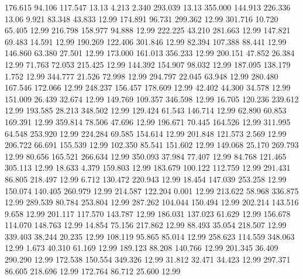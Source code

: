  176.615   94.106  117.547        13.13
   4.213    2.340  293.039        13.13
 355.000  144.913  226.336        13.06
   9.921   83.348   43.833        12.99
 174.891   96.731  299.362        12.99
 301.716   10.720   65.405        12.99
 216.798  158.977   94.888        12.99
 222.225   43.210  281.663        12.99
 147.821   69.483   14.591        12.99
 190.269  122.406  301.846        12.99
  82.394  107.388   88.441        12.99
 146.860   63.380   27.501        12.99
 173.000  161.013  356.233        12.99
 200.151   47.852   26.384        12.99
  71.763   72.053  215.425        12.99
 144.392  154.907   98.032        12.99
 187.095  138.179    1.752        12.99
 344.777   21.526   72.998        12.99
 294.797   22.045   63.948        12.99
 280.480  167.546  172.066        12.99
 248.237  156.457  178.609        12.99
  42.402   44.300   34.578        12.99
 151.009   26.439   32.674        12.99
 149.769  109.357  346.598        12.99
  16.705  120.236  239.612        12.99
 193.585   28.213  348.502        12.99
 129.424   61.543  146.714        12.99
  62.890   60.853  169.391        12.99
 359.814   78.506   47.696        12.99
 196.671   70.445  164.526        12.99
 311.995   64.548  253.920        12.99
 224.284   69.585  154.614        12.99
 201.848  121.573    2.569        12.99
 206.722   66.691  155.539        12.99
 102.350   85.541  151.602        12.99
 149.068   25.170  269.793        12.99
  80.656  165.521  266.634        12.99
 350.093   37.984   77.407        12.99
  84.768  121.465  305.113        12.99
  18.633    4.379  159.803        12.99
 183.679  100.122  112.759        12.99
 291.431   86.805  218.497        12.99
   6.712  130.472  220.943        12.99
  18.454  147.039  253.258        12.99
 150.074  140.405  260.979        12.99
 214.587  122.204    0.001        12.99
 213.622   58.968  336.875        12.99
 289.539   80.784  253.804        12.99
 287.262  104.044  150.494        12.99
 202.214  143.516    9.658        12.99
 201.117  117.570  143.787        12.99
 186.031  137.023   61.629        12.99
 156.678  114.070  148.763        12.99
  14.854   75.156  217.862        12.99
  88.493   35.054  218.507        12.99
 339.403   38.244   20.235        12.99
 108.119   95.865   85.014        12.99
 258.623  114.559  348.063        12.99
   1.673   40.310   61.169        12.99
 189.123   88.208  140.766        12.99
 201.345   36.409  290.290        12.99
 172.538  150.554  349.326        12.99
  31.812   32.471   34.423        12.99
 297.371   86.605  218.696        12.99
 172.764   86.712   25.600        12.99
